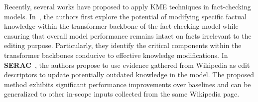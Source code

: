 \documentclass[acmsmall, screen]{acmart}
\begin{document}

 Recently, several works have proposed to apply KME techniques in fact-checking models. In~\cite{zhu2020modifying}, the authors first explore the potential of modifying specific factual knowledge within the transformer backbone of the fact-checking model while ensuring that overall model performance remains intact on facts irrelevant to the editing purpose. Particularly, they identify the critical components within the transformer backbones conducive to effective knowledge modifications. In \textbf{SERAC}~\cite{SERAC}, the authors propose to use evidence gathered from Wikipedia as edit descriptors to update potentially outdated knowledge in the model. The proposed method exhibits significant performance improvements over baselines and can be generalized to other in-scope inputs collected from the same Wikipedia page.






\end{document}
